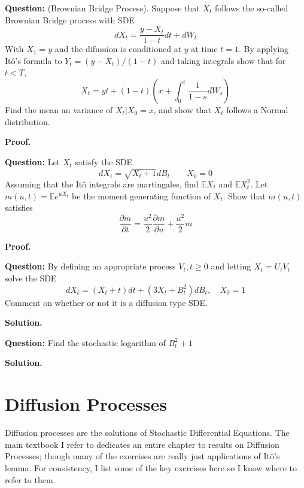 \documentclass{article}
\begin{document}
\begin{tcolorbox}[colframe=black,colback=gray!5,boxrule=0.5pt]
\textbf{Question:} (Brownian Bridge Process). Suppose that $X_t$ follows the so-called Brownian Bridge process with SDE
$$dX_t = \frac{y-X_t}{1-t}dt + dW_t$$
With $X_1=y$ and the difussion is conditioned at $y$ at time $t=1$.
By applying Itô's formula to $Y_t = (y-X_t)/(1-t)$ and taking integrals show that for $t<T$,
$$X_t = yt + (1-t)\left(x+\int_0^t\frac{1}{1-s}dW_s\right)$$
Find the mean an variance of $X_t| X_0=x$, and show that $X_t$ follows a Normal distribution.
\end{tcolorbox}
\textbf{Proof.}


\begin{tcolorbox}[colframe=black,colback=gray!5,boxrule=0.5pt]
\textbf{Question:} Let $X_t$ satisfy the SDE 
$$dX_t = \sqrt{X_t+1}dB_t \quad\quad X_0=0$$
Assuming that the Itô integrals are martingales, find $\mathbb{E}X_t$ and $\mathbb{E}X_t^2$. Let $m(u,t)=\mathbb{E}e^{uX_t}$ be the moment generating function of $X_t$. Show that $m(u,t)$ satisfies
$$\frac{\partial m}{\partial t} = \frac{u^2}{2}\frac{\partial m}{\partial u} + \frac{u^2}{2}m$$
\end{tcolorbox}
\textbf{Proof.}



\begin{tcolorbox}[colframe=black,colback=gray!5,boxrule=0.5pt]
\textbf{Question:} By defining an appropriate process $V_t, t\geq0$ and letting $X_t = U_tV_t$ solve the SDE
$$dX_t = (X_t+t)dt + (3X_t+B_t^2)dB_t, \quad X_0=1$$
Comment on whether or not it is a diffusion type SDE. 
\end{tcolorbox}
\textbf{Solution.}

\begin{tcolorbox}[colframe=black,colback=gray!5,boxrule=0.5pt]
\textbf{Question:} Find the stochastic logarithm of $B_t^2+1$
\end{tcolorbox}
\textbf{Solution.}


\newpage
\section{Diffusion Processes}

Diffusion processes are the solutions of Stochastic Differential Equations. The main textbook I refer to \cite{Fima} dedicates an entire chapter to results on Diffusion Processes; though many of the exercises are really just applications of Itô's lemma. For consistency, I list some of the key exercises here so I know where to refer to them.
\end{document}
